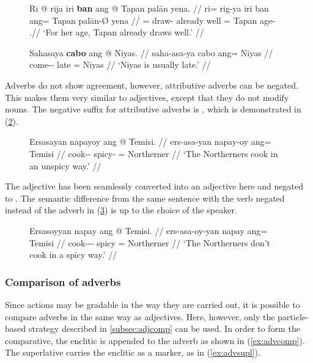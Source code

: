 \begin{figure}[h]
\pex
\a\label{ex:funcadv}\begingl
	\gla Ri @ rija iri \textbf{ban} ang @ Tapan palān yena. //
	\glb ri= rig-ya iri ban ang= Tapan palān-Ø yena //
	\glc \InsT{}= draw-\TsgM{} already well \Aarg{}= Tapan age-\Top{} 
		\TsgF{}.\Gen //
	\glft `For her age, Tapan already draws well.' //
\endgl

\a\label{ex:attradv}\begingl
	\gla Sahasaya \textbf{cabo} ang @ Niyas. //
	\glb saha-asa-ya cabo ang= Niyas //
	\glc come-\Hab{}-\TsgM{} late \Aarg{}= Niyas //
	\glft `Niyas is usually late.' //
\endgl
\xe
\end{figure}

Adverbs do not show agreement, however, attributive adverbs can be negated.
This makes them very similar to adjectives, except that they do not modify
nouns. The negative suffix for attributive adverbs is , which is
demonstrated in (\ref{ex:advneg}).

\begin{figure}[h]
\ex\label{ex:advneg}\begingl
	\gla Ersasayan napayoy ang @ Temisi. //
	\glb ers-asa-yan napay-oy ang= Temisi //
	\glc cook-\Hab{}-\TplM{} spicy-\Neg{} \Aarg{}= Northerner //
	\glft `The Northerners cook in an unspicy way.' //
\endgl\xe
\end{figure}

The adjective  has been seamlessly converted into an
adjective here and negated to . The semantic
difference from the same sentence with the verb negated instead of the adverb
in (\ref{ex:advneg_2}) is up to the choice of the speaker.

\begin{figure}[h]
\ex\label{ex:advneg_2}\begingl
	\gla Ersasoyyan napay ang @ Temisi. //
	\glb ers-asa-oy-yan napay ang= Temisi //
	\glc cook-\Hab{}-\Neg{}-\TplM{} spicy \Aarg{}= Northerner //
	\glft `The Northerners don't cook in a spicy way.' //
\endgl\xe
\end{figure}

\subsubsection{Comparison of adverbs}

Since actions may be gradable in the way they are carried out, it is 
possible to compare adverbs in the same way as adjectives. Here, however, only 
the particle-based strategy described in \autoref{subsec:adjcomp} 
can be used. In order to form the comparative, the enclitic 
 is appended to the adverb as shown in (\ref{ex:advcomp}). The
superlative carries the enclitic  as a marker, as in
(\ref{ex:advsupl}).


